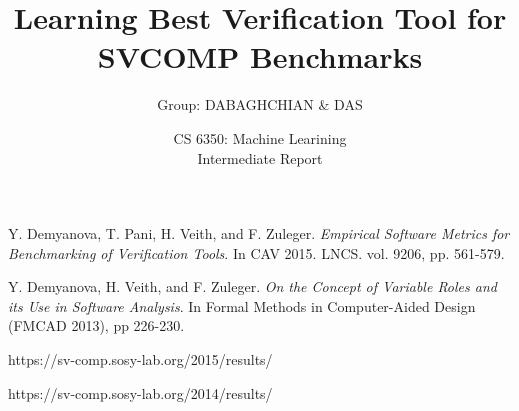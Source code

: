 \documentclass[11pt, fullpage,letterpaper]{article}
\title{Learning Best Verification Tool for SVCOMP Benchmarks}
\date{CS 6350: Machine Learining \semester\\Intermediate Report}
\author{Group: DABAGHCHIAN \& DAS}
\begin{document}
\maketitle

\pagebreak
{}











\pagebreak

\begin{thebibliography}{9}
Y. Demyanova, T. Pani, H. Veith, and F. Zuleger.
\textit{Empirical Software Metrics for Benchmarking of Verification Tools}. 
In CAV 2015. LNCS. vol. 9206, pp. 561-579.

Y. Demyanova, H. Veith, and F. Zuleger.
\textit{On the Concept of Variable Roles and its Use in Software Analysis}.
In Formal Methods in Computer-Aided Design (FMCAD 2013), pp 226-230.

https://sv-comp.sosy-lab.org/2015/results/

https://sv-comp.sosy-lab.org/2014/results/

\end{thebibliography}
\end{document}

